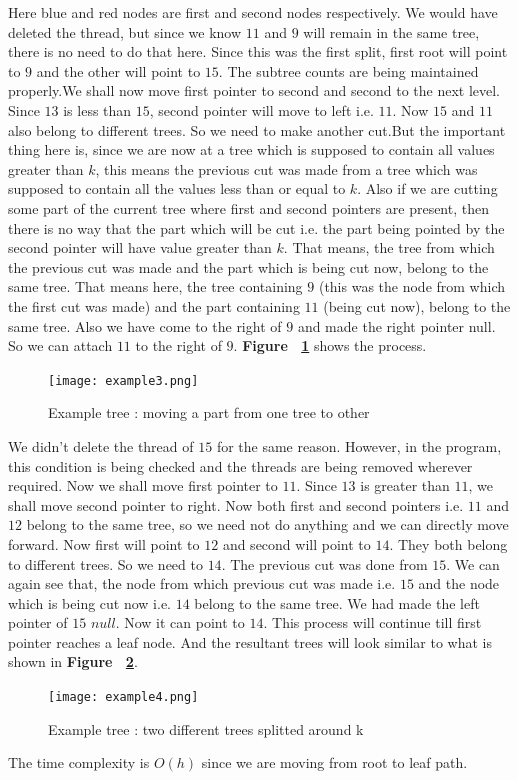 \documentclass{article}
\begin{document}
Here blue and red nodes are first and second nodes respectively. We would have deleted the thread, but since we know $11$ and $9$ will remain in the same tree, there is no need to do that here. Since this was the first split, first root will point to $9$ and the other will point to $15$. The subtree counts are being maintained properly.\newline We shall now move first pointer to second and second to the next level. Since $13$ is less than $15$, second pointer will move to left i.e. $11$. Now $15$ and $11$ also belong to different trees. So we need to make another cut.\newline But the important thing here is, since we are now at a tree which is supposed to contain all values greater than $k$, this means the previous cut was made from a tree which was supposed to contain all the values less than or equal to $k$. Also if we are cutting some part of the current tree where first and second pointers are present, then there is no way that the part which will be cut i.e. the part being pointed by the second pointer will have value greater than $k$. That means, the tree from which the previous cut was made and the part which is being cut now, belong to the same tree. That means here, the tree containing $9$ (this was the node from which the first cut was made) and the part containing $11$ (being cut now), belong to the same tree. Also we have come to the right of $9$ and made the right pointer null. So we can attach $11$ to the right of $9$. \textbf{Figure ~\ref{fig:ex3}} shows the process.
\begin{figure}
\texttt{[image: example3.png]}
\caption{Example tree : moving a part from one tree to other}
\label{fig:ex3}
\end{figure}
We didn't delete the thread of $15$ for the same reason. However, in the program, this condition is being checked and the threads are being removed wherever required. Now we shall move first pointer to $11$. Since $13$ is greater than $11$, we shall move second pointer to right. Now both first and second pointers i.e. $11$ and $12$ belong to the same tree, so we need not do anything and we can directly move forward.\newline
Now first will point to $12$ and second will point to $14$. They both belong to different trees. So we need to $14$. The previous cut was done from $15$. We can again see that, the node from which previous cut was made i.e. $15$ and the node which is being cut now i.e. $14$ belong to the same tree. We had made the left pointer of $15$ $null$. Now it can point to $14$.\newline
This process will continue till first pointer reaches a leaf node. And the resultant trees will look similar to what is shown in \textbf{Figure ~\ref{fig:ex4}}.
\begin{figure}
\texttt{[image: example4.png]}
\caption{Example tree : two different trees splitted around k}
\label{fig:ex4}
\end{figure}
The time complexity is $O(h)$ since we are moving from root to leaf path.
\end{document}
